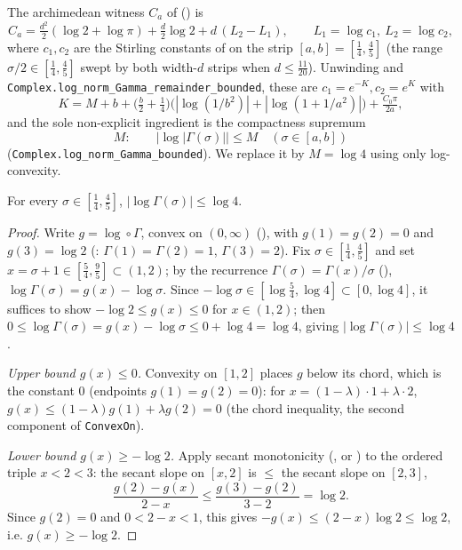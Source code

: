 The archimedean witness $C_a$ of 
() is
\[
  C_a=\tfrac{d^2}2(\log2+\log\pi)+\tfrac d2\log 2+d\,(L_2-L_1),
  \qquad L_1=\log c_1,\ L_2=\log c_2,
\]
where $c_1,c_2$ are the Stirling constants of
 on the strip $[a,b]=[\tfrac14,\tfrac45]$
(the range $\sigma/2\in[\tfrac14,\tfrac45]$ swept by both width-$d$ strips when
$d\le\tfrac{11}{20}$). Unwinding  and
\texttt{Complex.log\_norm\_Gamma\_remainder\_bounded}, these are $c_1=e^{-K},c_2=e^{K}$
with
\[
  K=M+b+\bigl(\tfrac b2+\tfrac14\bigr)\bigl(|\log(1/b^2)|+|\log(1+1/a^2)|\bigr)
     +\tfrac{C_0\pi}{2a},
\tag{K}
\]
and the sole non-explicit ingredient is the compactness supremum
\[
  M:\qquad |\log|\Gamma(\sigma)||\le M\quad(\sigma\in[a,b])
\]
(\texttt{Complex.log\_norm\_Gamma\_bounded}). We replace it by $M=\log 4$ using only
log-convexity.

\begin{lemma}
\label{lem:le_gamma_bounded}
\leanok
For every $\sigma\in[\tfrac14,\tfrac45]$, $\bigl|\log\Gamma(\sigma)\bigr|\le\log 4$.
\end{lemma}

\begin{proof}
\leanok
Write $g=\log\circ\Gamma$, convex on $(0,\infty)$
(), with $g(1)=g(2)=0$ and $g(3)=\log 2$
(: $\Gamma(1)=\Gamma(2)=1$, $\Gamma(3)=2$).
Fix $\sigma\in[\tfrac14,\tfrac45]$ and set $x=\sigma+1\in[\tfrac54,\tfrac95]\subset(1,2)$;
by the recurrence $\Gamma(\sigma)=\Gamma(x)/\sigma$ (),
$\log\Gamma(\sigma)=g(x)-\log\sigma$. Since $-\log\sigma\in[\log\tfrac54,\log 4]\subset[0,\log 4]$,
it suffices to show $-\log 2\le g(x)\le 0$ for $x\in(1,2)$; then
$0\le\log\Gamma(\sigma)=g(x)-\log\sigma\le 0+\log 4=\log 4$, giving
$|\log\Gamma(\sigma)|\le\log 4$.

\emph{Upper bound $g(x)\le 0$.} Convexity on $[1,2]$ places $g$ below its chord, which is
the constant $0$ (endpoints $g(1)=g(2)=0$): for $x=(1-\lambda)\cdot1+\lambda\cdot2$,
$g(x)\le(1-\lambda)g(1)+\lambda g(2)=0$ (the chord inequality, the second component of
\texttt{ConvexOn}).

\emph{Lower bound $g(x)\ge-\log 2$.} Apply secant monotonicity
(, or ) to the
ordered triple $x<2<3$: the secant slope on $[x,2]$ is $\le$ the secant slope on $[2,3]$,
\[
  \frac{g(2)-g(x)}{2-x}\le\frac{g(3)-g(2)}{3-2}=\log 2 .
\]
Since $g(2)=0$ and $0<2-x<1$, this gives $-g(x)\le(2-x)\log 2\le\log 2$, i.e.
$g(x)\ge-\log 2$.
\end{proof}

